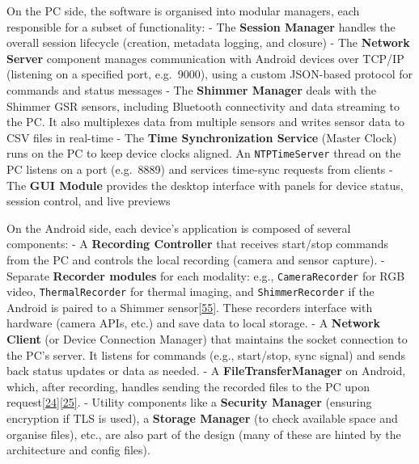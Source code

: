 \documentclass[12pt,a4paper]{article}
\begin{document}
On the PC side, the software is organised into modular managers, each responsible for a subset of functionality: - The \textbf{Session Manager} handles the overall session lifecycle (creation, metadata logging, and closure) - The \textbf{Network Server} component manages communication with Android devices over TCP/IP (listening on a specified port, e.g.~9000), using a custom JSON-based protocol for commands and status messages - The \textbf{Shimmer Manager} deals with the Shimmer GSR sensors, including Bluetooth connectivity and data streaming to the PC. It also multiplexes data from multiple sensors and writes sensor data to CSV files in real-time - The \textbf{Time Synchronization Service} (Master Clock) runs on the PC to keep device clocks aligned. An \passthrough{\lstinline!NTPTimeServer!} thread on the PC listens on a port (e.g.~8889) and services time-sync requests from clients - The \textbf{GUI Module} provides the desktop interface with panels for device status, session control, and live previews

On the Android side, each device's application is composed of several components: - A \textbf{Recording Controller} that receives start/stop commands from the PC and controls the local recording (camera and sensor capture). - Separate \textbf{Recorder modules} for each modality: e.g., \passthrough{\lstinline!CameraRecorder!} for RGB video, \passthrough{\lstinline!ThermalRecorder!} for thermal imaging, and \passthrough{\lstinline!ShimmerRecorder!} if the Android is paired to a Shimmer sensor\href{https://github.com/buccancs/bucika_gsr/blob/7048f7f6a7536f5cd577ed2184800d3dad97fd08/architecture.md\#L26-L34}{{[}55{]}}. These recorders interface with hardware (camera APIs, etc.) and save data to local storage. - A \textbf{Network Client} (or Device Connection Manager) that maintains the socket connection to the PC's server. It listens for commands (e.g., start/stop, sync signal) and sends back status updates or data as needed. - A \textbf{FileTransferManager} on Android, which, after recording, handles sending the recorded files to the PC upon request\href{https://github.com/buccancs/bucika_gsr/blob/7048f7f6a7536f5cd577ed2184800d3dad97fd08/AndroidApp/src/main/java/com/multisensor/recording/managers/FileTransferManager.kt\#L124-L132}{{[}24{]}}\href{https://github.com/buccancs/bucika_gsr/blob/7048f7f6a7536f5cd577ed2184800d3dad97fd08/AndroidApp/src/main/java/com/multisensor/recording/managers/FileTransferManager.kt\#L142-L150}{{[}25{]}}. - Utility components like a \textbf{Security Manager} (ensuring encryption if TLS is used), a \textbf{Storage Manager} (to check available space and organise files), etc., are also part of the design (many of these are hinted by the architecture and config files).
\end{document}
